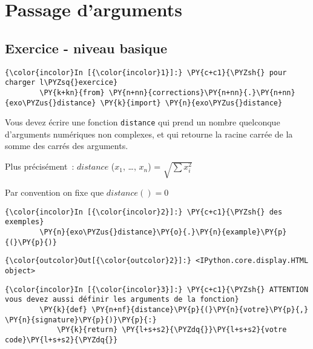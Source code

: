     
    
    
    

    

    \hypertarget{passage-darguments}{%
\section{Passage d'arguments}\label{passage-darguments}}

    \hypertarget{exercice---niveau-basique}{%
\subsection{Exercice - niveau basique}\label{exercice---niveau-basique}}

    \begin{Verbatim}[commandchars=\\\{\},frame=single,framerule=0.3mm,rulecolor=\color{cellframecolor}]
{\color{incolor}In [{\color{incolor}1}]:} \PY{c+c1}{\PYZsh{} pour charger l\PYZsq{}exercice}
        \PY{k+kn}{from} \PY{n+nn}{corrections}\PY{n+nn}{.}\PY{n+nn}{exo\PYZus{}distance} \PY{k}{import} \PY{n}{exo\PYZus{}distance}
\end{Verbatim}


    Vous devez écrire une fonction \texttt{distance} qui prend un nombre
quelconque d'arguments numériques non complexes, et qui retourne la
racine carrée de la somme des carrés des arguments.

Plus précisément~: \(distance\) (\(x_1\), \ldots{}, \(x_n\)) =
\(\sqrt{\sum x_i^2}\)

Par convention on fixe que \(distance() = 0\)

    \begin{Verbatim}[commandchars=\\\{\},frame=single,framerule=0.3mm,rulecolor=\color{cellframecolor}]
{\color{incolor}In [{\color{incolor}2}]:} \PY{c+c1}{\PYZsh{} des exemples}
        \PY{n}{exo\PYZus{}distance}\PY{o}{.}\PY{n}{example}\PY{p}{(}\PY{p}{)}
\end{Verbatim}


\begin{Verbatim}[commandchars=\\\{\},frame=single,framerule=0.3mm,rulecolor=\color{cellframecolor}]
{\color{outcolor}Out[{\color{outcolor}2}]:} <IPython.core.display.HTML object>
\end{Verbatim}
            
    \begin{Verbatim}[commandchars=\\\{\},frame=single,framerule=0.3mm,rulecolor=\color{cellframecolor}]
{\color{incolor}In [{\color{incolor}3}]:} \PY{c+c1}{\PYZsh{} ATTENTION vous devez aussi définir les arguments de la fonction}
        \PY{k}{def} \PY{n+nf}{distance}\PY{p}{(}\PY{n}{votre}\PY{p}{,} \PY{n}{signature}\PY{p}{)}\PY{p}{:}
            \PY{k}{return} \PY{l+s+s2}{\PYZdq{}}\PY{l+s+s2}{votre code}\PY{l+s+s2}{\PYZdq{}}
\end{Verbatim}


